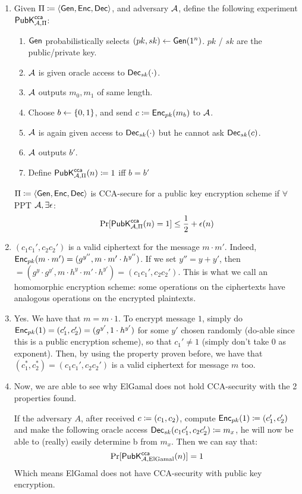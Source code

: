 \begin{solution}
	\begin{enumerate}
		\item
		Given  $\Pi \coloneqq \langle \operatorname{\mathsf{Gen}}, \operatorname{\mathsf{Enc}}, \operatorname{\mathsf{Dec}}\rangle$, and adversary $\mathcal{A}$, define the following experiment $\mathsf{PubK}^\mathsf{cca}_{\mathcal{A}, \Pi}$:
		\begin{enumerate}
			\item $\operatorname{\mathsf{Gen}}$ probabilistically selects $(pk, sk) \leftarrow \operatorname{\mathsf{Gen}}(1^n)$. $pk$ / $sk$ are the public/private key.
			\item $\mathcal{A}$ is given oracle access to $\operatorname{\mathsf{Dec}}_{sk}(\cdot)$.
			\item $\mathcal{A}$ outputs $m_0, m_1$ of same length.
			\item Choose $b \leftarrow \{0, 1\}$, and send $c \coloneqq \operatorname{\mathsf{Enc}}_{pk}(m_b)$ to $\mathcal{A}$.
			\item $\mathcal{A}$ is again given access to $\operatorname{\mathsf{Dec}}_{sk}(\cdot)$ but he cannot ask $\operatorname{\mathsf{Dec}}_{sk}(c)$.
			\item $\mathcal{A}$ outputs $b'$.
			\item Define $\mathsf{PubK}^\mathsf{cca}_{\mathcal{A}, \Pi}(n) \coloneqq 1$ iff $b=b'$
		\end{enumerate}
		$\Pi \coloneqq \langle \operatorname{\mathsf{Gen}}, \operatorname{\mathsf{Enc}}, \operatorname{\mathsf{Dec}} \rangle$ is CCA-secure for a public key encryption scheme if $\forall$ PPT $\mathcal{A}, \exists \epsilon$:
		\[ \Pr[\mathsf{PubK}^\mathsf{cca}_{\mathcal{A}, \Pi}(n)=1] \leq \frac{1}{2} + \epsilon(n) \]

		\item $(c_1c_1', c_2c_2')$ is a valid ciphertext for the message $m \cdot m'$.
		Indeed, $\operatorname{\mathsf{Enc}}_{pk}(m\cdot m')=(g^{y''}, m\cdot m' \cdot h^{y''})$. If we set $y''=y+y'$, then $=(g^y \cdot g^{y'}, m \cdot h^y \cdot m' \cdot h^{y'})=(c_1 c_1', c_2 c_2')$.
		This is what we call an homomorphic encryption scheme: some operations on the ciphertexts have analogous operations on the encrypted plaintexts.

		\item Yes. We have that $m = m \cdot 1$.
		To encrypt message $1$, simply do $\operatorname{\mathsf{Enc}}_{pk}(1)=(c_1', c_2')=(g^{y'}, 1\cdot h^{y'})$ for some $y'$ chosen randomly (do-able since this is a public encryption scheme), so that $c_1'\neq 1$ (simply don't take $0$ as exponent).
		Then, by using the property proven before, we have that $(c_1^*, c_2^*)=(c_1c_1', c_2c_2')$ is a valid ciphertext for message $m$ too.

		\item Now, we are able to see why ElGamal does not hold CCA-security with the 2 properties found.

		If the adversary $A$, after received $c \coloneqq (c_1, c_2)$, compute $\operatorname{\mathsf{Enc}}_{pk}(1) \coloneqq (c_1', c_2')$ and make the following oracle access $\operatorname{\mathsf{Dec}}_{sk}(c_1c_1',c_2c_2') \coloneqq m_x$, he will now be able to (really) easily determine b from $m_x$. Then we can say that:
		\[ \Pr[\mathsf{PubK}^\mathsf{cca}_{\mathcal{A}, \text{ElGamal}}(n)] = 1 \]
		Which means ElGamal does not have CCA-security with public key encryption.


\end{enumerate}
\end{solution}
